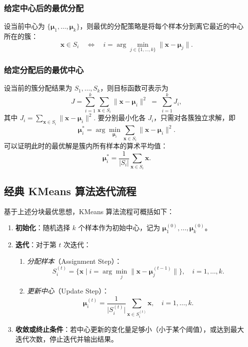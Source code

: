 \documentclass[12pt]{article}  %
\begin{document}
\subsubsection{给定中心后的最优分配}
设当前中心为 \(\{\boldsymbol{\mu}_1,\ldots,\boldsymbol{\mu}_k\}\)，则最优的分配策略是将每个样本分到离它最近的中心所在的簇：
\[
  \mathbf{x} \in S_i 
  \quad \Longleftrightarrow \quad
  i = \arg\min_{j \in \{1,\ldots,k\}} \|\mathbf{x} - \boldsymbol{\mu}_j\|.
\]

\subsubsection{给定分配后的最优中心}
设当前的簇分配结果为 \(S_1,\ldots,S_k\)，则目标函数可表示为
\[
  J = \sum_{i=1}^k \sum_{\mathbf{x} \in S_i} \|\mathbf{x} - \boldsymbol{\mu}_i\|^2 
  \;=\; \sum_{i=1}^k J_i,
\]
其中
\(
  J_i = \sum_{\mathbf{x} \in S_i} \|\mathbf{x} - \boldsymbol{\mu}_i\|^2.
\)
要分别最小化各 \(J_i\)，只需对各簇独立求解，即
\[
  \boldsymbol{\mu}_i^* = \arg\min_{\boldsymbol{\mu}_i} \sum_{\mathbf{x} \in S_i} \|\mathbf{x} - \boldsymbol{\mu}_i\|^2.
\]
可以证明此时的最优解是簇内所有样本的算术平均值：
\[
  \boldsymbol{\mu}_i^* = \frac{1}{|S_i|} \sum_{\mathbf{x} \in S_i} \mathbf{x}.
\]

\subsection{经典 KMeans 算法迭代流程}

基于上述分块最优思想，KMeans 算法流程可概括如下：
\begin{enumerate}
    \item \textbf{初始化}：随机选择 \(k\) 个样本作为初始中心，记为 \(\boldsymbol{\mu}_1^{(0)}, \ldots, \boldsymbol{\mu}_k^{(0)}\)。
    \item \textbf{迭代}：对于第 \(t\) 次迭代：
    \begin{enumerate}
        \item \emph{分配样本}（Assignment Step）：
        \[
          S_i^{(t)} = \Big\{\mathbf{x} \mid 
          i = \arg\min_{j} \|\mathbf{x} - \boldsymbol{\mu}_j^{(t-1)}\| \Big\}, \quad i=1,\ldots,k.
        \]
        \item \emph{更新中心}（Update Step）：
        \[
          \boldsymbol{\mu}_i^{(t)} 
          = \frac{1}{\big|S_i^{(t)}\big|} \sum_{\mathbf{x} \in S_i^{(t)}} \mathbf{x}, 
          \quad i=1,\ldots,k.
        \]
    \end{enumerate}
    \item \textbf{收敛或终止条件}：若中心更新的变化量足够小（小于某个阈值），或达到最大迭代次数，停止迭代并输出结果。
\end{enumerate}
\end{document}
